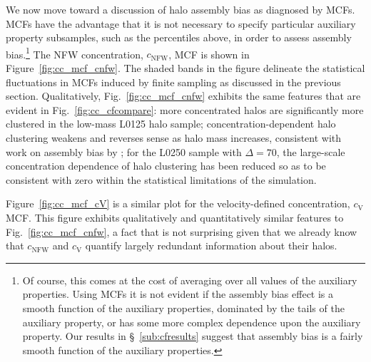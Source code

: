 \documentclass[usenatbib,usegraphicx,letterpaper]{mn2e}
\begin{document}
We now move toward a discussion of halo assembly bias as diagnosed by MCFs. 
MCFs have the advantage that it is not necessary 
to specify particular auxiliary property subsamples, such as the percentiles above, 
in order to assess assembly bias.\footnote{Of course, this comes at the cost of averaging 
over all values of the auxiliary properties. Using MCFs it is not evident if the assembly bias effect is a smooth
function of the auxiliary properties, dominated by the tails of the auxiliary property, or has some more complex
dependence upon the auxiliary property. Our results in \S~\ref{sub:cfresults} suggest that assembly bias is a
fairly smooth function of the auxiliary properties.} 
The NFW concentration, $c_{\mathrm{NFW}}$, MCF is shown in Figure~\ref{fig:cc_mcf_cnfw}. 
The shaded bands in the figure delineate the statistical fluctuations in MCFs induced by 
finite sampling as discussed in the previous section. Qualitatively, 
Fig.~\ref{fig:cc_mcf_cnfw} exhibits the same features that are evident in 
Fig.~\ref{fig:cc_cfcompare}: more concentrated halos are significantly more clustered in 
the low-mass L0125 halo sample; concentration-dependent halo clustering weakens and 
reverses sense as halo mass increases, consistent with work on assembly bias by \citet{sunayama16}; for the 
L0250 sample with $\Delta=70$, the large-scale concentration dependence of halo clustering has been reduced so as to 
be consistent with zero within the statistical limitations of the simulation. 


Figure~\ref{fig:cc_mcf_cV} is a similar plot for the velocity-defined concentration, $c_{\mathrm{V}}$ MCF. 
This figure exhibits qualitatively and quantitatively similar features to Fig.~\ref{fig:cc_mcf_cnfw}, a 
fact that is not surprising given that we already know that $c_{\mathrm{NFW}}$ and $c_{\mathrm{V}}$ 
quantify largely redundant information about their halos.
\end{document}
